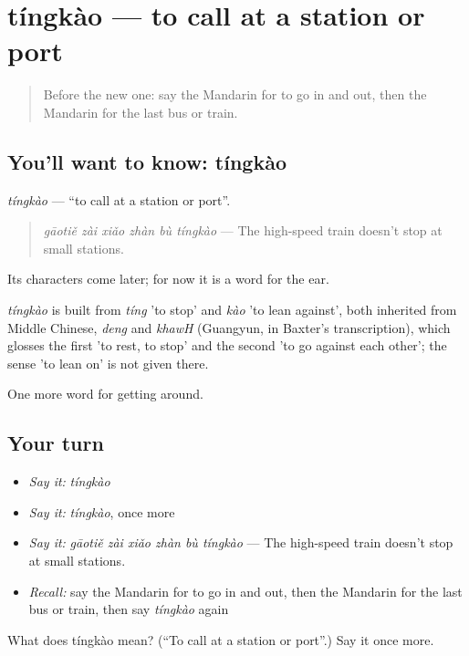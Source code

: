 \section[tíngkào]{tíngkào — to call at a station or port}

\label{lesson:ZH-C405-tingkao}



\begin{quote}
Before the new one: say the Mandarin for to go in and out, then the Mandarin for the last bus or train.
\end{quote}

\subsection*{You'll want to know: tíngkào}
\emph{tíngkào} — \textquotedblleft{}to call at a station or port\textquotedblright{}.

\begin{quote}
\emph{gāotiě zài xiǎo zhàn bù tíngkào} — The high-speed train doesn't stop at small stations.
\end{quote}

Its characters come later; for now it is a word for the ear.

\begin{cousinweb}
\emph{tíngkào} is built from \emph{tíng} 'to stop' and \emph{kào} 'to lean against', both inherited from Middle Chinese, \emph{deng} and \emph{khawH} (Guangyun, in Baxter's transcription), which glosses the first 'to rest, to stop' and the second 'to go against each other'; the sense 'to lean on' is not given there.
\end{cousinweb}

\begin{grammarlens}[title={What you've built}]
One more word for getting around.
\end{grammarlens}

\subsection*{Your turn}
\begin{itemize}
\raggedright
  \item \emph{Say it:} \emph{tíngkào}
  \item \emph{Say it:} \emph{tíngkào}, once more
  \item \emph{Say it:} \emph{gāotiě zài xiǎo zhàn bù tíngkào} — The high-speed train doesn't stop at small stations.
  \item \emph{Recall:} say the Mandarin for to go in and out, then the Mandarin for the last bus or train, then say \emph{tíngkào} again
\end{itemize}

\begin{tcolorbox}[breakable,colback=teal!4,colframe=teal!35!black,title={Before you move on}]
What does tíngkào mean? (\textquotedblleft{}To call at a station or port\textquotedblright{}.) Say it once more.
\end{tcolorbox}

